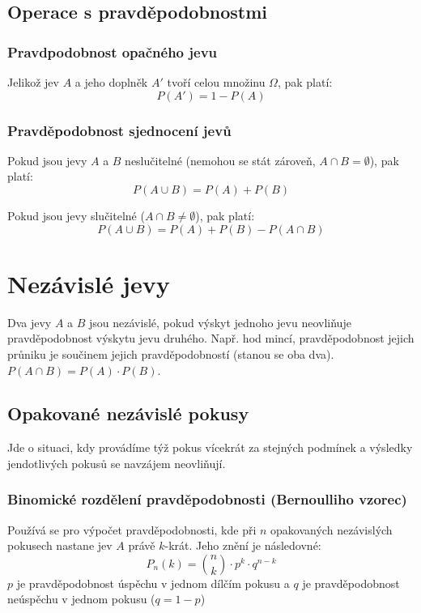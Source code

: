 \documentclass[12pt]{article}
\begin{document}
\subsection*{Operace s pravděpodobnostmi}
\subsubsection*{Pravdpodobnost opačného jevu}
Jelikož jev $A$ a jeho doplněk $A'$ tvoří celou množinu $\Omega$, pak platí:
\[P(A') = 1-P(A)\]

\subsubsection*{Pravděpodobnost sjednocení jevů}
Pokud jsou jevy $A$ a $B$ neslučitelné (nemohou se stát zároveň, $A \cap B = \emptyset$), pak platí:
\[P(A\cup B) = P(A) + P(B)\]

Pokud jsou jevy slučitelné ($A \cap B \neq \emptyset$), pak platí:
\[P(A\cup B) = P(A) + P(B) - P(A\cap B)\]

\section*{Nezávislé jevy}
Dva jevy $A$ a $B$ jsou nezávislé, pokud výskyt jednoho jevu neovliňuje pravděpodobnost výskytu jevu druhého.
 Např. hod mincí, pravděpodobnost jejich průniku je součinem jejich pravděpodobností (stanou se oba dva).
$P(A\cap B) = P(A) \cdot P(B)$.

\subsection*{Opakované nezávislé pokusy}
Jde o situaci, kdy provádíme týž pokus vícekrát za stejných podmínek a výsledky jendotlivých pokusů se navzájem neovliňují.

\subsubsection*{Binomické rozdělení pravděpodobnosti (Bernoulliho vzorec)}
Používá se pro výpočet pravděpodobnosti, kde při $n$ opakovaných nezávislých pokusech nastane jev $A$ právě $k$-krát. Jeho znění je následovné:
\[P_n(k) = \binom{n}{k}\cdot p^k \cdot q^{n-k}\]
$p$ je pravděpodobnost úspěchu v jednom dílčím pokusu a $q$ je pravděpodobnost neúspěchu v jednom pokusu ($q = 1-p$)
\end{document}
